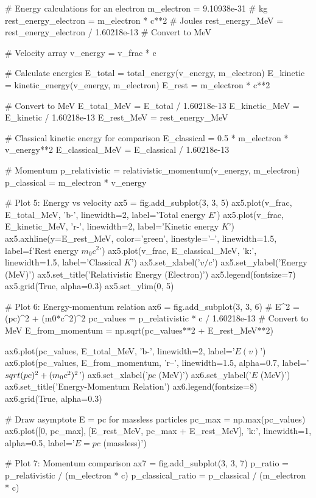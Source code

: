 \documentclass[a4paper, 11pt]{article}
\begin{document}
\begin{pycode}
# Energy calculations for an electron
m_electron = 9.10938e-31  # kg
rest_energy_electron = m_electron * c**2  # Joules
rest_energy_MeV = rest_energy_electron / 1.60218e-13  # Convert to MeV

# Velocity array
v_energy = v_frac * c

# Calculate energies
E_total = total_energy(v_energy, m_electron)
E_kinetic = kinetic_energy(v_energy, m_electron)
E_rest = m_electron * c**2

# Convert to MeV
E_total_MeV = E_total / 1.60218e-13
E_kinetic_MeV = E_kinetic / 1.60218e-13
E_rest_MeV = rest_energy_MeV

# Classical kinetic energy for comparison
E_classical = 0.5 * m_electron * v_energy**2
E_classical_MeV = E_classical / 1.60218e-13

# Momentum
p_relativistic = relativistic_momentum(v_energy, m_electron)
p_classical = m_electron * v_energy

# Plot 5: Energy vs velocity
ax5 = fig.add_subplot(3, 3, 5)
ax5.plot(v_frac, E_total_MeV, 'b-', linewidth=2, label='Total energy $E$')
ax5.plot(v_frac, E_kinetic_MeV, 'r-', linewidth=2, label='Kinetic energy $K$')
ax5.axhline(y=E_rest_MeV, color='green', linestyle='--', linewidth=1.5,
            label=f'Rest energy $m_0c^2$')
ax5.plot(v_frac, E_classical_MeV, 'k:', linewidth=1.5, label='Classical $K$')
ax5.set_xlabel('$v/c$')
ax5.set_ylabel('Energy (MeV)')
ax5.set_title('Relativistic Energy (Electron)')
ax5.legend(fontsize=7)
ax5.grid(True, alpha=0.3)
ax5.set_ylim(0, 5)

# Plot 6: Energy-momentum relation
ax6 = fig.add_subplot(3, 3, 6)
# E^2 = (pc)^2 + (m0*c^2)^2
pc_values = p_relativistic * c / 1.60218e-13  # Convert to MeV
E_from_momentum = np.sqrt(pc_values**2 + E_rest_MeV**2)

ax6.plot(pc_values, E_total_MeV, 'b-', linewidth=2, label='$E(v)$')
ax6.plot(pc_values, E_from_momentum, 'r--', linewidth=1.5, alpha=0.7,
         label='$\\sqrt{(pc)^2 + (m_0c^2)^2}$')
ax6.set_xlabel('$pc$ (MeV)')
ax6.set_ylabel('$E$ (MeV)')
ax6.set_title('Energy-Momentum Relation')
ax6.legend(fontsize=8)
ax6.grid(True, alpha=0.3)

# Draw asymptote E = pc for massless particles
pc_max = np.max(pc_values)
ax6.plot([0, pc_max], [E_rest_MeV, pc_max + E_rest_MeV], 'k:',
         linewidth=1, alpha=0.5, label='$E=pc$ (massless)')

# Plot 7: Momentum comparison
ax7 = fig.add_subplot(3, 3, 7)
p_ratio = p_relativistic / (m_electron * c)
p_classical_ratio = p_classical / (m_electron * c)


\end{pycode}
\end{document}

